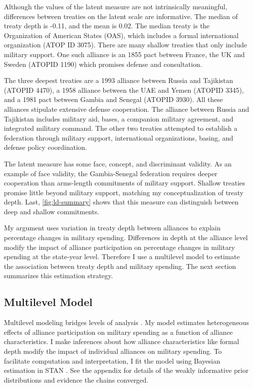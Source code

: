\documentclass[12pt]{article}
\begin{document}
Although the values of the latent measure are not intrinsically meaningful, differences between treaties on the latent scale are informative. 
The median of treaty depth is -0.11, and the mean is 0.02. 
The median treaty is the Organization of American States (OAS), which includes a formal international organization (ATOP ID 3075). 
There are many shallow treaties that only include military support. 
One such alliance is an 1855 pact between France, the UK and Sweden (ATOPID 1190) which promises defense and consultation. 


The three deepest treaties are a 1993 alliance between Russia and Tajikistan (ATOPID 4470), a 1958 alliance between the UAE and Yemen (ATOPID 3345), and a 1981 pact between Gambia and Senegal (ATOPID 3930). 
All these alliances stipulate extensive defense cooperation. 
The alliance between Russia and Tajikistan includes military aid, bases, a companion military agreement, and integrated military command. 
The other two treaties attempted to establish a federation through military support, international organizations, basing, and defense policy coordination. 


The latent measure has some face, concept, and discriminant validity. 
As an example of face validity, the Gambia-Senegal federation requires deeper cooperation than arms-length commitments of military support. 
Shallow treaties promise little beyond military support, matching my conceptualization of treaty depth. 
Last, \autoref{fig:ld-summary} shows that this measure can distinguish between deep and shallow commitments. 


My argument uses variation in treaty depth between alliances to explain percentage changes in military spending.
Differences in depth at the alliance level modify the impact of alliance participation on percentage changes in military spending at the state-year level. 
Therefore I use a multilevel model to estimate the association between treaty depth and military spending.  
The next section summarizes this estimation strategy. 


\subsection{Multilevel Model} 


Multilevel modeling bridges levels of analysis \citep{SteenbergenJones2002, GelmanHill2007}. 
My model estimates heterogeneous effects of alliance participation on military spending as a function of alliance characteristics. 
I make inferences about how alliance characteristics like formal depth modify the impact of individual alliances on military spending. 
To facilitate computation and interpretation, I fit the model using Bayesian estimation in STAN \citep{Carpenteretal2016}. 
See the appendix for details of the weakly informative prior distributions and evidence the chains converged.
\end{document}
